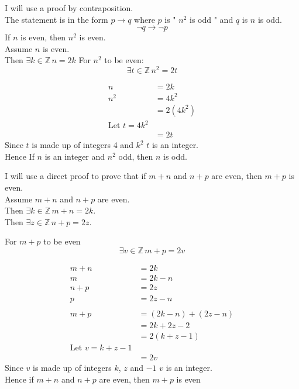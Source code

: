 \documentclass[12pt letter]{report}
\begin{document}
\begin{myproof}
	I will use a proof by contraposition.\\
	The statement is in the form $p \to q$ where $p$ is " $n^2$ is odd " and $q$ is $n$ is odd.\\
	\[
		\neg q \to \neg p
	\]
	If $n$ is even, then $n^2$ is even.\\
	Assume $n$ is even.\\
	Then $\exists k \in \mathbb{Z} \, n = 2k$
	For $n^2$ to be even:
	\[
		\exists t \in \mathbb{Z} \, n^2 = 2t
	\]

	\begin{align*}
		n   & = 2k                    \\
		n^2 & = 4k^2                  \\
		    & = 2 \left( 4k^2 \right) \\
		\text{Let } t = 4k^2          \\
		    & = 2t
	\end{align*}
	Since $t$ is made up of integers 4 and $k^2$ $t$ is an integer.\\
	Hence If $n$ is an integer and $n^2$ odd, then $n$ is odd.
\end{myproof}


\begin{myproof}
	I will use a direct proof to prove that if $m + n$ and $n + p$ are even, then $m + p$ is even. \\
	Assume $m + n$ and $n + p$ are even.\\
	Then $\exists k \in \mathbb{Z}\, m + n = 2k$.\\
	Then $\exists z \in \mathbb{Z} \, n + p = 2z$.

	For $m + p$ to be even
	\[
		\exists v \in \mathbb{Z} \, m + p = 2v
	\]

	\begin{align*}
		m + n & = 2k                                             \\
		m     & = 2k - n                                         \\
		n + p & = 2z                                             \\
		p     & = 2z -n                                          \\
		\\
		m + p & = \left( 2k - n \right)  + \left( 2z - n \right) \\
		      & = 2k + 2z -2                                     \\
		      & = 2 \left( k + z -1  \right)                     \\
		\text{Let } v = k + z -1                                 \\
		      & = 2v
	\end{align*}
	Since $v$ is made up of integers $k$, $z$ and $-1$ $v$ is an integer.\\
	Hence if $m + n$ and $n + p$ are even, then $m + p$ is even
\end{myproof}
\end{document}
